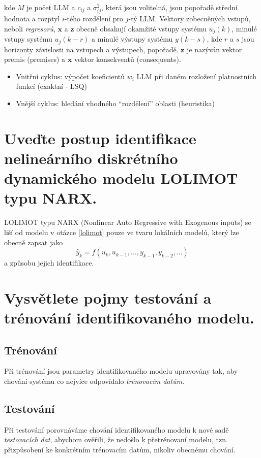 \documentclass{article}
\begin{document}
	kde $M$ je počet LLM a $c_{ij}$ a $\sigma^2_{ij}$, která jsou volitelná, jsou popořadě střední hodnota a rozptyl $i$-tého rozdělení pro $j$-tý LLM. Vektory zobecněných vstupů, neboli \emph{regresorů}, $\bm{x}$ a $\bm{z}$ obecně obsahují okamžité vstupy systému $u_j(k)$, minulé vstupy systému $u_j(k-r)$ a minulé výstupy systému $y(k-s)$, kde $r$ a $s$ jsou horizonty závislosti na vstupech a výstupech, popořadě. $\bm{z}$ je nazýván vektor premis (premises) a $\bm{x}$ vektor konsekventů (consequents).

	\begin{itemize}
	\item Vnitřní cyklus: výpočet koeficientů $w_i$ LLM při daném rozložení platnostních funkcí (exaktní - LSQ)
	\item Vnější cyklus: hledání vhodného ``rozdělení'' oblasti (heuristika)
	\end{itemize}


	\section{Uveďte postup identifikace nelineárního diskrétního dynamického modelu LOLIMOT typu NARX. }

	LOLIMOT typu NARX (Nonlinear Auto Regressive with Exogenous inputs) se liší od modelu v otázce \ref{lolimot} pouze ve tvaru lokálních modelů, který lze obecně zapsat jako
	\begin{equation}
		\hat{y}_k = f(u_k,u_{k-1},\dots,y_{k-1},y_{k-2},\dots)
	\end{equation}
	a způsobu jejich identifikace.

	\section{Vysvětlete pojmy testování a trénování identifikovaného modelu.}

	\subsection*{Trénování}
	Při trénování jsou parametry identifikovaného modelu upravovány tak, aby chování systému co nejvíce odpovídalo \emph{trénovacím datům}.

	\subsection*{Testování}
	Při testování porovnáváme chování identifikovaného modelu k nové sadě \emph{testovacích dat}, abychom ověřili, že nedošlo k přetrénovaní modelu, tzn. přizpůsobení ke konkrétním trénovacím datům, nikoliv obecnému chování.
\end{document}
